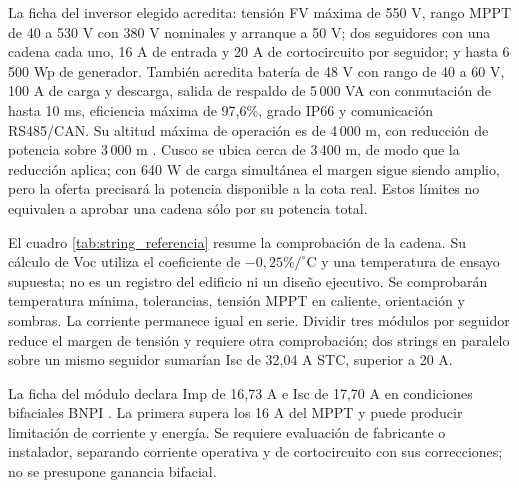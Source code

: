 La ficha del inversor elegido acredita: tensión FV máxima de 550 V, rango MPPT de 40 a 530 V con 380 V nominales y arranque a 50 V; dos seguidores con una cadena cada uno, 16 A de entrada y 20 A de cortocircuito por seguidor; y hasta 6\,500 Wp de generador. También acredita batería de 48 V con rango de 40 a 60 V, 100 A de carga y descarga, salida de respaldo de 5\,000 VA con conmutación de hasta 10 ms, eficiencia máxima de 97,6\%, grado IP66 y comunicación RS485/CAN. Su altitud máxima de operación es de 4\,000 m, con reducción de potencia sobre 3\,000 m \cite{tensiteinv}. Cusco se ubica cerca de 3\,400 m, de modo que la reducción aplica; con 640 W de carga simultánea el margen sigue siendo amplio, pero la oferta precisará la potencia disponible a la cota real. Estos límites no equivalen a aprobar una cadena sólo por su potencia total.

\begin{table}[htbp]
\end{table}
El cuadro \ref{tab:string_referencia} resume la comprobación de la cadena. Su cálculo de Voc utiliza el coeficiente de $-0,25\%/^{\circ}$C y una temperatura de ensayo supuesta; no es un registro del edificio ni un diseño ejecutivo. Se comprobarán temperatura mínima, tolerancias, tensión MPPT en caliente, orientación y sombras. La corriente permanece igual en serie. Dividir tres módulos por seguidor reduce el margen de tensión y requiere otra comprobación; dos strings en paralelo sobre un mismo seguidor sumarían Isc de 32,04 A STC, superior a 20 A.

La ficha del módulo declara Imp de 16,73 A e Isc de 17,70 A en condiciones bifaciales BNPI \cite{jinko}. La primera supera los 16 A del MPPT y puede producir limitación de corriente y energía. Se requiere evaluación de fabricante o instalador, separando corriente operativa y de cortocircuito con sus correcciones; no se presupone ganancia bifacial.

